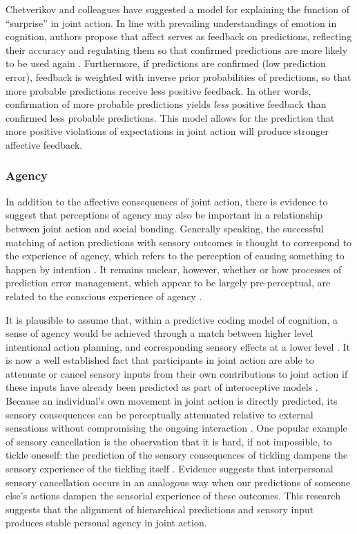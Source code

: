 \begin{CJK}{UTF8}{gbsn}
Chetverikov \textcite{Chetverikov2016} and colleagues have suggested a model for explaining the function of ``surprise'' in joint action.  In line with prevailing understandings of emotion in cognition, authors propose that affect serves as feedback on predictions, reflecting their accuracy and regulating them so that confirmed predictions are more likely to be used again \citep{Chetverikov2014}.  Furthermore, if predictions are confirmed (low prediction error), feedback is weighted with inverse prior probabilities of predictions, so that more probable predictions receive less positive feedback. In other words, confirmation of more probable predictions yields \textit{less} positive feedback than confirmed less probable predictions.  This model allows for the prediction that more positive violations of expectations in joint action will produce stronger affective feedback.

\subsubsection{Agency}
In addition to the affective consequences of joint action, there is evidence to suggest that perceptions of agency may also be important in a relationship between joint action and social bonding. Generally speaking, the successful matching of action predictions with sensory outcomes is thought to correspond to the experience of agency, which refers to the perception of causing something to happen by intention \citep{Frith2007,Pacherie2012,Obhi2011}.  It remains unclear, however, whether or how processes of prediction error management, which appear to be largely pre-perceptual, are related to the conscious experience of agency \citep{Pesquita2017}.

It is plausible to assume that, within a predictive coding model of cognition, a sense of agency would be achieved through a match between higher level intentional action planning, and corresponding sensory effects at a lower level \citep{VanderWel2012}.  It is now a well established fact that participants in joint action are able to attenuate or cancel sensory inputs from their own contributions to joint action if these inputs have already been predicted as part of interoceptive models \citep{Blakemore2005}.  Because an individual's own movement in joint action is directly predicted, its sensory consequences can be perceptually attenuated relative to external sensations without compromising the ongoing interaction \citep{Blakemore1999}. One popular example of sensory cancellation is the observation that it is hard, if not impossible, to tickle oneself: the prediction of the sensory consequences of tickling dampens the sensory experience of the tickling itself \citep{Frith2007}.  Evidence suggests that interpersonal sensory cancellation occurs in an analogous way when our predictions of someone else’s actions dampen the sensorial experience of these outcomes\citep{Sato2008}.  This research suggests that the alignment of hierarchical predictions and sensory input produces stable personal agency in joint action.


\end{CJK}
